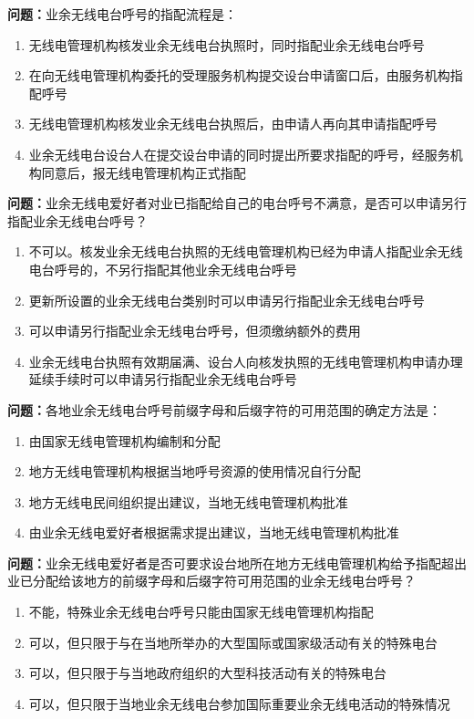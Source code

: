 \bigskip


\noindent\textbf{问题：}业余无线电台呼号的指配流程是：
\begin{enumerate}[label=\Alph*), leftmargin=3em]
\item 无线电管理机构核发业余无线电台执照时，同时指配业余无线电台呼号
\item 在向无线电管理机构委托的受理服务机构提交设台申请窗口后，由服务机构指配呼号
\item 无线电管理机构核发业余无线电台执照后，由申请人再向其申请指配呼号
\item 业余无线电台设台人在提交设台申请的同时提出所要求指配的呼号，经服务机构同意后，报无线电管理机构正式指配
\end{enumerate}

\bigskip


\noindent\textbf{问题：}业余无线电爱好者对业已指配给自己的电台呼号不满意，是否可以申请另行指配业余无线电台呼号？
\begin{enumerate}[label=\Alph*), leftmargin=3em]
\item 不可以。核发业余无线电台执照的无线电管理机构已经为申请人指配业余无线电台呼号的，不另行指配其他业余无线电台呼号
\item 更新所设置的业余无线电台类别时可以申请另行指配业余无线电台呼号
\item 可以申请另行指配业余无线电台呼号，但须缴纳额外的费用
\item 业余无线电台执照有效期届满、设台人向核发执照的无线电管理机构申请办理延续手续时可以申请另行指配业余无线电台呼号
\end{enumerate}

\bigskip


\noindent\textbf{问题：}各地业余无线电台呼号前缀字母和后缀字符的可用范围的确定方法是：
\begin{enumerate}[label=\Alph*), leftmargin=3em]
\item 由国家无线电管理机构编制和分配
\item 地方无线电管理机构根据当地呼号资源的使用情况自行分配
\item 地方无线电民间组织提出建议，当地无线电管理机构批准
\item 由业余无线电爱好者根据需求提出建议，当地无线电管理机构批准
\end{enumerate}

\bigskip


\noindent\textbf{问题：}业余无线电爱好者是否可要求设台地所在地方无线电管理机构给予指配超出业已分配给该地方的前缀字母和后缀字符可用范围的业余无线电台呼号？
\begin{enumerate}[label=\Alph*), leftmargin=3em]
\item 不能，特殊业余无线电台呼号只能由国家无线电管理机构指配
\item 可以，但只限于与在当地所举办的大型国际或国家级活动有关的特殊电台
\item 可以，但只限于与当地政府组织的大型科技活动有关的特殊电台
\item 可以，但只限于当地业余无线电台参加国际重要业余无线电活动的特殊情况
\end{enumerate}

